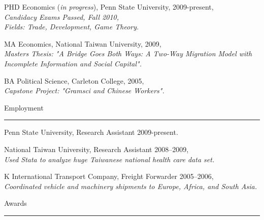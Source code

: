 \documentclass[letterpaper]{article}
\renewenvironment{itemize}{
  \begin{list}{}{
    \setlength{\leftmargin}{1.5em}
  }
}{
  \end{list}
}
\begin{document}
\begin{itemize}
  \item PHD Economics (\emph{in progress}), Penn State University, 2009-present,\\
	\hspace*{1cm}\emph{Candidacy Exams Passed, Fall 2010,}\\
	\hspace*{1cm}\emph{Fields: Trade, Development, Game Theory.}
	

  \item MA Economics, National Taiwan University, 2009,\\
	\hspace*{1cm}\emph{Masters Thesis: "A Bridge Goes Both Ways: A Two-Way Migration Model with Incomplete Information \hspace*{1cm}and Social Capital".}

  \item BA Political Science, Carleton College, 2005,\\
	\hspace*{1cm}\emph{Capstone Project: "Gramsci and Chinese Workers".}
\end{itemize}

\vspace{4mm}
{\Large Employment}
 \hrule

\begin{itemize}
\item Penn State University, Research Assistant 2009-present.
\item National Taiwan University, Research Assistant 2008--2009,\\
	\hspace*{1cm}\emph{Used Stata to analyze huge Taiwanese national health care data set.}
\item K International Transport Company, Freight Forwarder 2005--2006,\\
	\hspace*{1cm}\emph{Coordinated vehicle and machinery shipments to Europe, Africa, and South Asia.} 
\end{itemize}

\vspace{4mm}
{\Large Awards}
\vspace{1mm}
 \hrule
\end{document}
